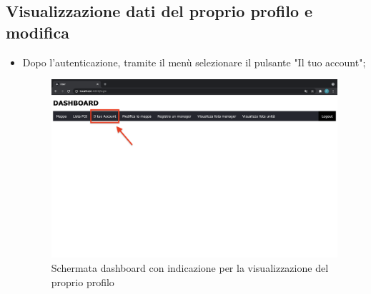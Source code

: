 \subsection{Visualizzazione dati del proprio profilo e modifica}
\begin{itemize}
    \item Dopo l'autenticazione, tramite il menù selezionare il pulsante "Il tuo account";
    \begin{figure}[H]
        \centering
        \includegraphics[scale=0.12]{res/images/dashboard3.png}
        \caption{Schermata dashboard con indicazione per la visualizzazione del proprio profilo}
    \end{figure}
    

\end{itemize}
